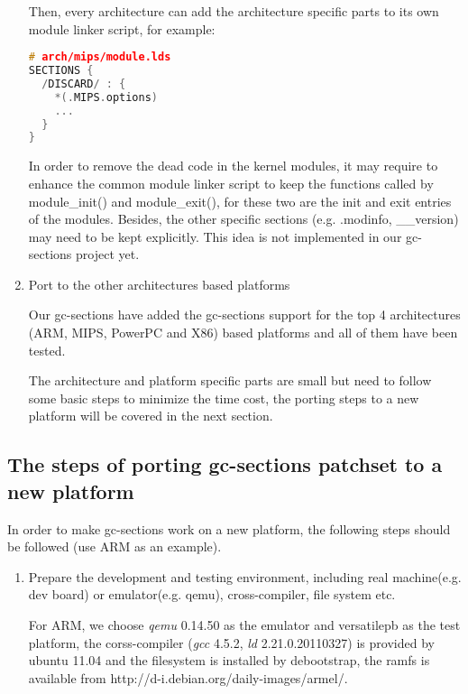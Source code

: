 \documentclass[10pt,a4paper]{article}
\begin{document}
\begin{multicols}{2}
\begin{enumerate}
Then, every architecture can add the architecture specific parts to its own
module linker script, for example:

\begin{lstlisting}[language=c,
                  commentstyle=\fontsize{7}{8}\selectfont,
                  basicstyle=\ttfamily\fontsize{7}{8}\selectfont]
# arch/mips/module.lds
SECTIONS {
  /DISCARD/ : {
    *(.MIPS.options)
    ...
  }
}
\end{lstlisting}

In order to remove the dead code in the kernel modules, it may require to
enhance the common module linker script to keep the functions called by
module\_init() and module\_exit(), for these two are the init and exit entries of
the modules. Besides, the other specific sections (e.g. .modinfo, \_\_version)
may need to be kept explicitly. This idea is not implemented in our
gc-sections project yet.

\item Port to the other architectures based platforms

Our gc-sections have added the gc-sections support for the top 4 architectures
(ARM, MIPS, PowerPC and X86) based platforms and all of them have been tested.

The architecture and platform specific parts are small but need to follow some
basic steps to minimize the time cost, the porting steps to a new platform will
be covered in the next section.

\end{enumerate}

\subsection{The steps of porting gc-sections patchset to a new platform}

In order to make gc-sections work on a new platform, the following steps should
be followed (use ARM as an example).

\begin{enumerate}

\item Prepare the development and testing environment, including real
machine(e.g. dev board) or emulator(e.g. qemu), cross-compiler, file system
etc.

For ARM, we choose {\em qemu} 0.14.50 as the emulator and versatilepb as the test
platform, the corss-compiler ({\em gcc} 4.5.2, {\em ld} 2.21.0.20110327) is provided by
ubuntu 11.04 and the filesystem is installed by debootstrap, the ramfs is
available from http://d-i.debian.org/daily-images/armel/.


\end{enumerate}
\end{multicols}
\end{document}
